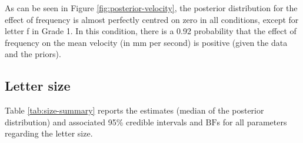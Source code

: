 \documentclass[
  11pt,
  english,
  ,doc,floatsintext]{apa6}
\begin{document}
As can be seen in Figure \ref{fig:posterior-velocity}, the posterior distribution for the effect of frequency is almost perfectly centred on zero in all conditions, except for letter f in Grade 1. In this condition, there is a 0.92 probability that the effect of frequency on the mean velocity (in mm per second) is positive (given the data and the priors).

\hypertarget{letter-size}{%
\subsection{Letter size}\label{letter-size}}

Table \ref{tab:size-summary} reports the estimates (median of the posterior distribution) and associated 95\% credible intervals and \(\text{BF}\)s for all parameters regarding the letter size.
\end{document}
